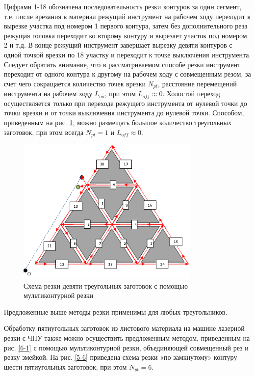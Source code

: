 \documentclass[12pt,twoside]{report}
\begin{document}
Цифрами 1-18 обозначена последовательность
резки контуров за один сегмент,
т.е. после врезания в материал режущий инструмент
на рабочем ходу переходит к вырезке участка
под номером 1 первого контура,
затем без дополнительного реза режущая
головка переходит ко второму контуру и
вырезает участок под номером 2 и т.д.
В конце режущий инструмент завершает
вырезку девяти контуров с одной точкой врезки
по 18 участку и переходит к точке выключения инструмента.
Следует обратить внимание, что в рассматриваемом способе
резки инструмент переходит от одного контура к
другому на рабочем ходу с совмещенным резом,
за счет чего сокращается количество точек врезки $N_{pt}$,
расстояние перемещений инструмента на рабочем ходу  $L_{on}$,
при этом
$L_{off} \approx 0$.
Холостой переход осуществляется
только при переходе режущего инструмента
от нулевой точки до точки врезки и от
точки выключения инструмента до нулевой точки.
Способом, приведенным на рис. \ref{3-10},
можно размещать большое количество
треугольных заготовок, при этом всегда $N_{pt}=1$
и $L_{off} \approx 0$.

\begin{figure}
  \begin{center}
  \includegraphics[width=0.8\textwidth]{3-10.png}
  \caption{Схема резки девяти треугольных заготовок с помощью мультиконтурной резки}
  \label{3-10}
  \end{center}
\end{figure}

Предложенные выше методы резки  применимы для любых треугольников.

Обработку пятиугольных заготовок из листового материала
на машине лазерной резки с ЧПУ также можно осуществить
предложенным методом, приведенным на рис. \ref{6-1}
с помощью мультиконтурной резки,
объединяющей совмещенный рез и резку змейкой.
На рис. \ref{5-6}
приведена схема резки «по замкнутому» контуру
шести пятиугольных заготовок;
при этом $N_{pt}=6$.
\end{document}
